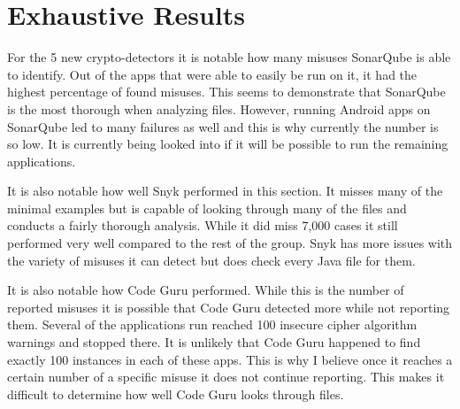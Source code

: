 \section{Exhaustive Results}
\label{ch5:sec:discussion}



For the 5 new crypto-detectors it is notable how many misuses SonarQube is able to identify. Out of the apps that were able to easily be run on it, it had the highest percentage of found misuses. This seems to demonstrate that SonarQube is the most thorough when analyzing files. However, running Android apps on SonarQube led to many failures as well and this is why currently the number is so low. It is currently being looked into if it will be possible to run the remaining applications. 

It is also notable how well Snyk performed in this section. It misses many of the minimal examples but is capable of looking through many of the files and conducts a fairly thorough analysis. While it did miss 7,000 cases it still performed very well compared to the rest of the group. Snyk has more issues with the variety of misuses it can detect but does check every Java file for them.

It is also notable how Code Guru performed. While this is the number of reported misuses it is possible that Code Guru detected more while not reporting them. Several of the applications run reached 100 insecure cipher algorithm warnings and stopped there. It is unlikely that Code Guru happened to find exactly 100 instances in each of these apps. This is why I believe once it reaches a certain number of a specific misuse it does not continue reporting. This makes it difficult to determine how well Code Guru looks through files.
